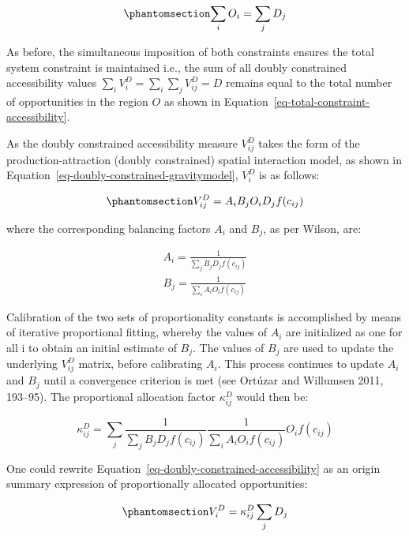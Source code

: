 \documentclass[
]{article}
\begin{document}
\begin{equation}\phantomsection\label{eq-opportunity-population-equality}{
\sum_i O_i = \sum_j D_j
}\end{equation}

As before, the simultaneous imposition of both constraints ensures the
total system constraint is maintained i.e., the sum of all doubly
constrained accessibility values
\(\sum_i V^D_{i} = \sum_i\sum_j  V^D_{ij} = D\) remains equal to the
total number of opportunities in the region \(O\) as shown in
Equation~\ref{eq-total-constraint-accessibility}.

As the doubly constrained accessibility measure \(V_{ij}^D\) takes the
form of the production-attraction (doubly constrained) spatial
interaction model, as shown in
Equation~\ref{eq-doubly-constrained-gravitymodel}, \(V_{i}^D\) is as
follows:

\begin{equation}\phantomsection\label{eq-doubly-constrained-accessibility}{
V_{ij}^D = A_i B_j O_i D_j f(c_{ij})
}\end{equation}

\noindent where the corresponding balancing factors \(A_i\) and \(B_j\),
as per Wilson, are:

\[
\begin{array}{l}
A_i = \frac{1}{\sum_j B_j D_j f(c_{ij})}\\
B_j = \frac{1}{\sum_i A_i O_i f(c_{ij})}
\end{array}
\]

Calibration of the two sets of proportionality constants is accomplished
by means of iterative proportional fitting, whereby the values of
\(A_i\) are initialized as one for all i to obtain an initial estimate
of \(B_j\). The values of \(B_j\) are used to update the underlying
\(V_{ij}^D\) matrix, before calibrating \(A_i\). This process continues
to update \(A_i\) and \(B_j\) until a convergence criterion is met (see
Ortúzar and Willumsen 2011, 193--95). The proportional allocation factor
\(\kappa_{ij}^D\) would then be:

\[
\kappa_{ij}^D = \sum_j \frac{1}{\sum_j B_j D_j f(c_{ij})} \frac{1}{\sum_i A_i O_i f(c_{ij})} O_i f(c_{ij})
\]

One could rewrite Equation~\ref{eq-doubly-constrained-accessibility} as
an origin summary expression of proportionally allocated opportunities:

\begin{equation}\phantomsection\label{eq-doubly-constrained-accessibility-w-paf}{
V^D_{i} = \kappa^D_{ij} \sum_j D_j
}\end{equation}
\end{document}
